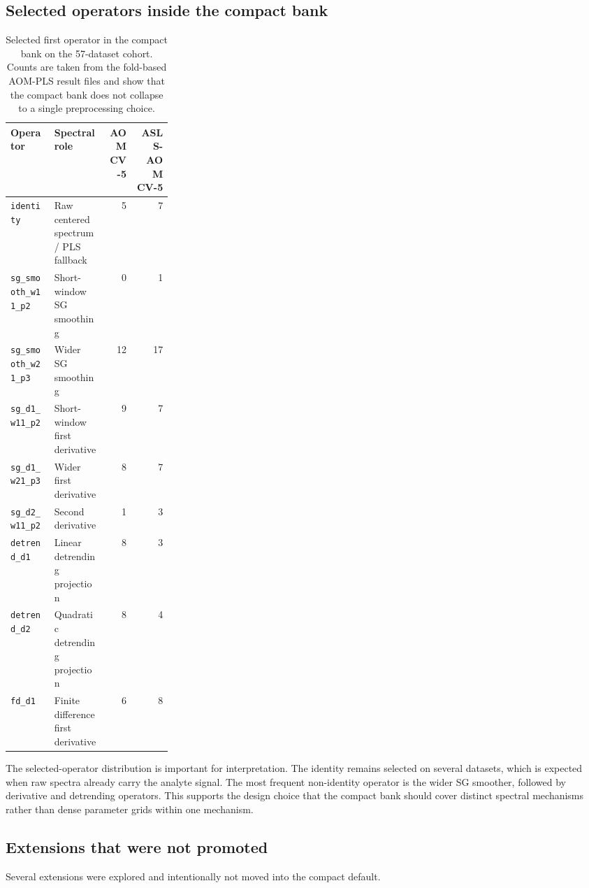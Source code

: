 \documentclass[11pt,a4paper]{article}
\newcommand{\code}[1]{\nolinkurl{#1}}
\begin{document}
\subsection{Selected operators inside the compact bank}

\begin{table}[h]
\centering
\caption{Selected first operator in the compact bank on the 57-dataset
cohort.  Counts are taken from the fold-based AOM-PLS result files and show
that the compact bank does not collapse to a single preprocessing choice.}
\small
\begin{tabularx}{\linewidth}{L{0.27\linewidth}Xrr}
\toprule
Operator & Spectral role & AOM CV-5 & ASLS-AOM CV-5 \\
\midrule
\code{identity} & Raw centered spectrum / PLS fallback & 5 & 7\\
\code{sg_smooth_w11_p2} & Short-window SG smoothing & 0 & 1\\
\code{sg_smooth_w21_p3} & Wider SG smoothing & 12 & 17\\
\code{sg_d1_w11_p2} & Short-window first derivative & 9 & 7\\
\code{sg_d1_w21_p3} & Wider first derivative & 8 & 7\\
\code{sg_d2_w11_p2} & Second derivative & 1 & 3\\
\code{detrend_d1} & Linear detrending projection & 8 & 3\\
\code{detrend_d2} & Quadratic detrending projection & 8 & 4\\
\code{fd_d1} & Finite difference first derivative & 6 & 8\\
\bottomrule
\end{tabularx}
\end{table}

The selected-operator distribution is important for interpretation.  The
identity remains selected on several datasets, which is expected when raw
spectra already carry the analyte signal.  The most frequent non-identity
operator is the wider SG smoother, followed by derivative and detrending
operators.  This supports the design choice that the compact bank should cover
distinct spectral mechanisms rather than dense parameter grids within one
mechanism.

\subsection{Extensions that were not promoted}

Several extensions were explored and intentionally not moved into the compact
default.
\end{document}
